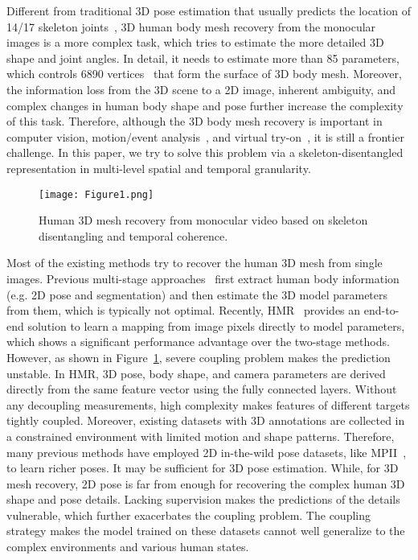 \documentclass[10pt,twocolumn,letterpaper]{article}
\begin{document}
Different from traditional 3D pose estimation that usually predicts the location of 14/17 skeleton joints~\cite{tpnet,simple}, 3D human body mesh recovery from the monocular images is a more complex task, which tries to estimate the more detailed 3D shape and joint angles. In detail, it needs to estimate more than 85 parameters, which controls 6890 vertices~\cite{smpl} that form the surface of 3D body mesh. Moreover, the information loss from the 3D scene to a 2D image, inherent ambiguity, and complex changes in human body shape and pose further increase the complexity of this task. Therefore, although the 3D body mesh recovery is important in computer vision, motion/event analysis~\cite{liu2015devnet,liu2016recognizing,liu2013accurate,liu2017progressive,liu2018t}, and virtual try-on~\cite{dong2019flow,dong2019mgvton}, it is still a frontier challenge. In this paper, we try to solve this problem via a skeleton-disentangled representation in multi-level spatial and temporal granularity.

\begin{figure}
	\begin{center}
		\texttt{[image: Figure1.png]}
		\caption{Human 3D mesh recovery from monocular video based on skeleton disentangling and temporal coherence.}
		\label{fig:videoresult}
	\end{center}
\vspace{-6mm}
\end{figure}

Most of the existing methods try to recover the human 3D mesh from single images. Previous multi-stage approaches~\cite{unite,neuralbodyfitting,humanshape} first extract human body information (e.g. 2D pose and segmentation) and then estimate the 3D model parameters from them, which is typically not optimal. Recently, HMR~\cite{hmr} provides an end-to-end solution to learn a mapping from image pixels directly to model parameters, which shows a significant performance advantage over the two-stage methods. However, as shown in Figure~\ref{fig:videoresult}, severe coupling problem makes the prediction unstable. In HMR, 3D pose, body shape, and camera parameters are derived directly from the same feature vector using the fully connected layers. Without any decoupling measurements, high complexity makes features of different targets tightly coupled. Moreover, existing datasets with 3D annotations are collected in a constrained environment with limited motion and shape patterns. Therefore, many previous methods have employed 2D in-the-wild pose datasets, like MPII~\cite{mpii}, to learn richer poses. It may be sufficient for 3D pose estimation. While, for 3D mesh recovery, 2D pose is far from enough for recovering the complex human 3D shape and pose details. Lacking supervision makes the predictions of the details vulnerable, which further exacerbates the coupling problem. The coupling strategy makes the model trained on these datasets cannot well generalize to the complex environments and various human states.
\end{document}
